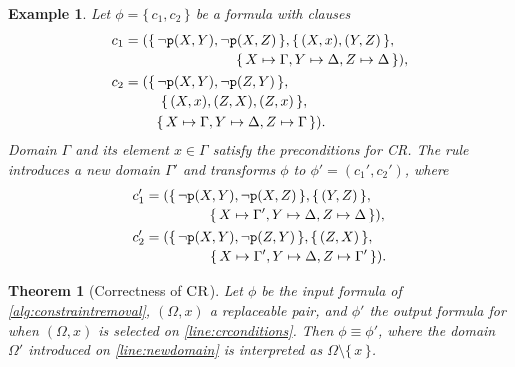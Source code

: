 \documentclass{article}
\newtheorem{theorem}{Theorem}
\newtheorem{example}{Example}
\newcommand{\predicate}{\texttt{\textup{p}}}
\DeclareMathOperator{\CR}{\textsc{CR}}
\begin{document}
\begin{example}
  Let $\phi = \{\, c_1, c_2 \,\}$ be a formula with clauses
  \begin{align*}
    c_1 &=
          \begin{multlined}[t]
            (\{\, \neg \predicate(X, Y), \neg \predicate(X, Z) \,\}, \{\, (X, x), (Y, Z) \,\}, \\
            \{\, X \mapsto \Gamma, Y \mapsto \Delta, Z \mapsto \Delta \,\}),
          \end{multlined}\\
    c_2 &=
          \begin{multlined}[t]
            (\{\, \neg \predicate(X, Y), \neg \predicate(Z, Y) \,\}, \\
            \{\, (X, x), (Z, X), (Z, x) \,\}, \\
            \{\, X \mapsto \Gamma, Y \mapsto \Delta, Z \mapsto \Gamma \,\}).
          \end{multlined}
  \end{align*}
  Domain $\Gamma$ and its element $x \in \Gamma$ satisfy the preconditions for
  CR\@. The rule introduces a new domain $\Gamma'$ and transforms $\phi$ to
  $\phi' = (c_1', c_2')$, where
  \begin{align*}
    c_1' &=
           \begin{multlined}[t]
             (\{\, \neg \predicate(X, Y), \neg \predicate(X, Z) \,\}, \{\, (Y, Z) \,\}, \\
             \{\, X \mapsto \Gamma', Y \mapsto \Delta, Z \mapsto \Delta \,\}),
           \end{multlined} \\
    c_2' &=
           \begin{multlined}[t]
             (\{\, \neg \predicate(X, Y), \neg \predicate(Z, Y) \,\}, \{\, (Z, X) \,\}, \\
             \{\, X \mapsto \Gamma', Y \mapsto \Delta, Z \mapsto \Gamma' \,\}).
           \end{multlined}
  \end{align*}
\end{example}

\begin{theorem}[Correctness of $\CR$]
  Let $\phi$ be the input formula of \cref{alg:constraintremoval}, $(\Omega, x)$
  a replaceable pair, and $\phi'$ the output formula for when $(\Omega, x)$ is
  selected on \cref{line:crconditions}. Then $\phi \equiv \phi'$, where the
  domain $\Omega'$ introduced on \cref{line:newdomain} is interpreted as
  $\Omega \setminus \{\, x \,\}$.
\end{theorem}
\end{document}
